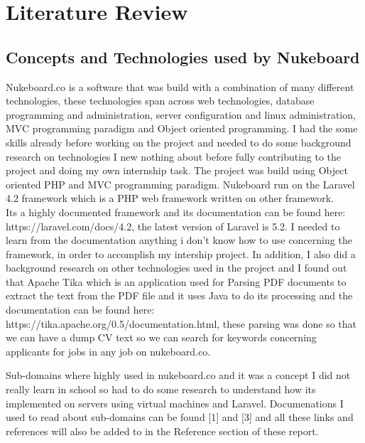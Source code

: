 
\chapter{Literature Review} %

\label{Chapter2} %


\section{Concepts and Technologies used by Nukeboard}

Nukeboard.co is a software that was build with a combination of many different technologies, these technologies span across web technologies, database programming and administration, server configuration and linux administration, MVC programming paradigm and Object oriented programming. I had the some skills already before working on the project and needed to do some background research on technologies I new nothing about before fully contributing to the project and doing my own internship task.  The project was build using Object oriented PHP and MVC programming paradigm. Nukeboard run on the Laravel 4.2 framework which is a PHP web framework written on other framework. \\

Its a highly documented framework and its documentation can be found here: \\
https://laravel.com/docs/4.2, the latest version of Laravel is 5.2. I needed to learn from the documentation anything i don't know how to use concerning the framework, in order to accomplish my intership project. In addition, I also did a background research on other technologies used in the project and I found out that Apache Tika which is an application used for Parsing PDF documents to extract the text from the PDF file and it uses Java to do its processing and the documentation can be found here:\\ https://tika.apache.org/0.5/documentation.html, these parsing was done so that we can have a dump CV text so we can search for keywords concerning applicants for jobs in any job on nukeboard.co.

Sub-domains where highly used in nukeboard.co and it was a concept I did not really learn in school so had to do some research to understand how its implemented on servers using virtual machines and Laravel. Documenations I used to read about sub-domains can be found [1] and [3] and all these links and references will also be added to in the Reference section of these report. \\

